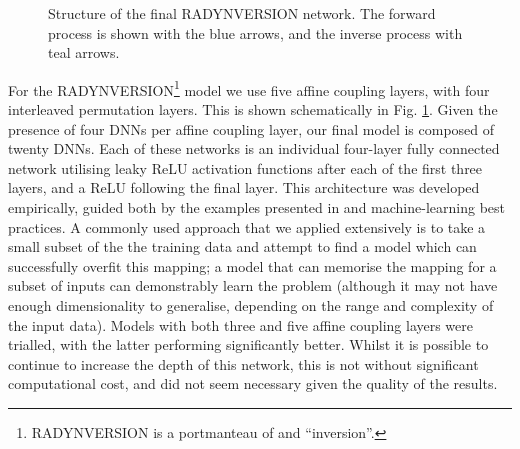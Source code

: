 \begin{figure}[htbp]
\caption[Structure of the invertible RADYNVERSION network.]{Structure of the final RADYNVERSION network. The forward process is shown with the {\color{TolBlue}blue} arrows, and the inverse process with {\color{TolTeal}teal} arrows.}
\label{Fig:RadynversionDiagram}
\end{figure}

For the RADYNVERSION\footnote{RADYNVERSION is a portmanteau of \Radyn{} and ``inversion''.} model we use five affine coupling layers, with four interleaved permutation layers.
This is shown schematically in Fig. \ref{Fig:RadynversionDiagram}.
Given the presence of four DNNs per affine coupling layer, our final model is composed of twenty DNNs.
Each of these networks is an individual four-layer fully connected network utilising leaky ReLU activation functions after each of the first three layers, and a ReLU following the final layer.
This architecture was developed empirically, guided both by the examples presented in \citep{2018Ardizzone} and machine-learning best practices.
A commonly used approach that we applied extensively is to take a small subset of the the training data and attempt to find a model which can successfully overfit this mapping; a model that can memorise the mapping for a subset of inputs can demonstrably learn the problem (although it may not have enough dimensionality to generalise, depending on the range and complexity of the input data).
Models with both three and five affine coupling layers were trialled, with the latter performing significantly better.
Whilst it is possible to continue to increase the depth of this network, this is not without significant computational cost, and did not seem necessary given the quality of the results.

